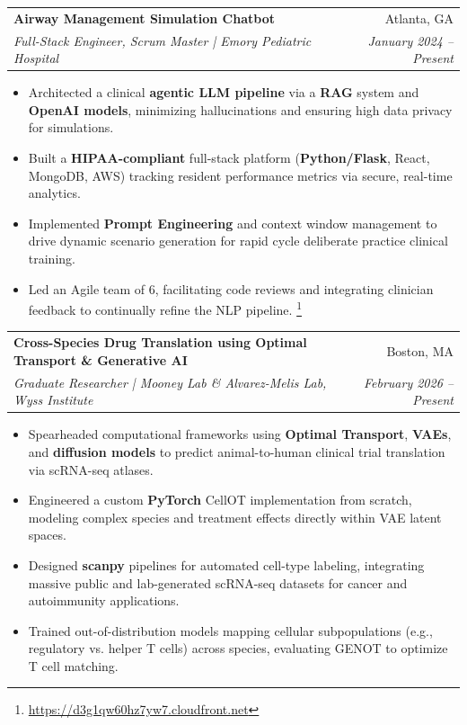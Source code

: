\documentclass[a4paper,10pt]{article}
\makeatletter
\newcommand{\resumeSubheading}[4]{
  \vspace{-1pt}\item
    \begin{tabular*}{0.97\textwidth}{l@{\extracolsep{\fill}}r}
      \textbf{#1} & #2 \\
      \textit{#3} & \textit{#4} \\
    \end{tabular*}\vspace{-5pt}
}
\newcommand{\resumeItemListStart}{\begin{itemize}}
\newcommand{\resumeItemListEnd}{\end{itemize}\vspace{-6pt}}
\makeatother
\begin{document}
  \resumeSubheading
    {Airway Management Simulation Chatbot}{Atlanta, GA}
    {Full-Stack Engineer, Scrum Master | Emory Pediatric Hospital}{January 2024 -- Present}
    \resumeItemListStart
      \item Architected a clinical \textbf{agentic LLM pipeline} via a \textbf{RAG} system and \textbf{OpenAI models}, minimizing hallucinations and ensuring high data privacy for simulations.
      \item Built a \textbf{HIPAA-compliant} full-stack platform (\textbf{Python/Flask}, React, MongoDB, AWS) tracking resident performance metrics via secure, real-time analytics.
      \item Implemented \textbf{Prompt Engineering} and context window management to drive dynamic scenario generation for rapid cycle deliberate practice clinical training.
      \item Led an Agile team of 6, facilitating code reviews and integrating clinician feedback to continually refine the NLP pipeline. \footnote{\url{https://d3g1qw60hz7yw7.cloudfront.net}}
    \resumeItemListEnd

  \resumeSubheading
    {Cross-Species Drug Translation using Optimal Transport \& Generative AI}{Boston, MA}
    {Graduate Researcher | Mooney Lab \& Alvarez-Melis Lab, Wyss Institute}{February 2026 -- Present}
    \resumeItemListStart
      \item Spearheaded computational frameworks using \textbf{Optimal Transport}, \textbf{VAEs}, and \textbf{diffusion models} to predict animal-to-human clinical trial translation via scRNA-seq atlases.
      \item Engineered a custom \textbf{PyTorch} CellOT implementation from scratch, modeling complex species and treatment effects directly within VAE latent spaces.
      \item Designed \textbf{scanpy} pipelines for automated cell-type labeling, integrating massive public and lab-generated scRNA-seq datasets for cancer and autoimmunity applications.
      \item Trained out-of-distribution models mapping cellular subpopulations (e.g., regulatory vs. helper T cells) across species, evaluating GENOT to optimize T cell matching.
    \resumeItemListEnd
\end{document}
